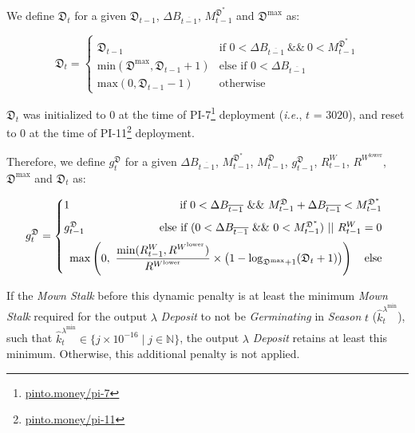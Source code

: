 \documentclass[tikz]{article}
\makeatletter
\newenvironment{keepunit}{%
  \par\penalty0\begingroup
  \edef\keepunitparskip{\the\parskip}%
  \noindent\begin{minipage}[t]{\linewidth}%
  \setlength{\parskip}{\keepunitparskip}%
  \@minipagefalse
}{%
  \end{minipage}\par\endgroup
}
\newcommand{\term}[1]{\textsl{#1}}
\newcommand{\fref}[1]{\footnote{\href{http://#1}{#1}}}
\makeatother
\begin{document}
\begin{keepunit}
We define $\mathfrak{D}_{t}$ for a given $\mathfrak{D}_{t-1}$, $\Delta B_{\overline{t-1}}$, $M_{t-1}^{\mathfrak{D}^{*}}$ and $\mathfrak{D}^{\text{max}}$ as:

    $$
        \mathfrak{D}_{t} =
            \begin{cases}
                \mathfrak{D}_{t-1} & \text{if }0<\Delta B_{\overline{t-1}}\ \&\&\ 0<M_{t-1}^{\mathfrak{D}^{*}}\\
                \text{min}(\mathfrak{D}^{\text{max}}, \mathfrak{D}_{t-1} + 1)
                    & \text{else if } 0 < \Delta B_{\overline{t-1}} \\
                \text{max}(0, \mathfrak{D}_{t-1} - 1) 
                    & \text{otherwise } 
            \end{cases}
    $$
\end{keepunit}

$\mathfrak{D}_{t}$ was initialized to $0$ at the time of PI-7\fref{pinto.money/pi-7} deployment (\textit{i.e.}, $t$ = $3020$), and reset to $0$ at the time of PI-11\fref{pinto.money/pi-11} deployment.

\begin{keepunit}
Therefore, we define $g_t^{\mathfrak{D}}$ for a given $\Delta B_{\overline{t-1}}$, $M_{t-1}^{\mathfrak{D}^{*}}$, $M_{t-1}^{\mathfrak{D}}$, $g_{t-1}^{\mathfrak{D}}$, $R_{t-1}^{W}$, $R^{W^{\text{lower}}}$, $\mathfrak{D}^{\text{max}}$ and $\mathfrak{D}_{t}$ as:

    $$
        g_t^{\mathfrak{D}} =
        \begin{cases}
            1 & \multicolumn{1}{r}{\text{if }0<\Delta B_{\overline{t-1}}\ \&\&\ M_{t-1}^{\mathfrak{D}}+\Delta B_{\overline{t-1}}<M_{t-1}^{\mathfrak{D}^{*}}}\\[2mm]
            g_{t-1}^{\mathfrak{D}} & \multicolumn{1}{r}{\text{else if }(0<\Delta B_{\overline{t-1}}\ \&\&\ 0<M_{t-1}^{\mathfrak{D}^{*}})\mkern6mu ||\mkern6mu R_{t-1}^{W}=0}\\[2mm]
            \multicolumn{2}{l}{\displaystyle\max\left(0,\ \frac{\min(R_{t-1}^{W},R^{W^{\text{lower}}})}{R^{W^{\text{lower}}}}
                \times\left(1-\log_{\mathfrak{D}^{\text{max}}+1}(\mathfrak{D}_{t}+1)\right)\right)\quad\text{else}}
        \end{cases}
    $$

If the \term{Mown Stalk} before this dynamic penalty is at least the minimum \term{Mown Stalk} required for the output $\lambda$ \term{Deposit} to not be \term{Germinating} in \term{Season} $t$ ($\widehat{k}_t^{\lambda^{\text{min}}}$), such that $\widehat{k}_t^{\lambda^{\text{min}}} \in \{j \times 10^{-16} \mid j \in \mathbb{N} \}$, the output $\lambda$ \term{Deposit} retains at least this minimum. Otherwise, this additional penalty is not applied.
\end{keepunit}
\end{document}
